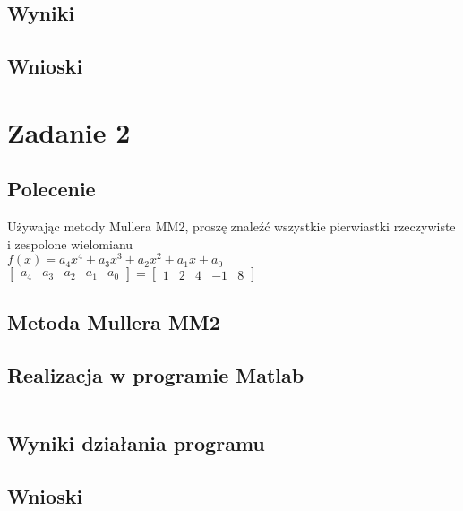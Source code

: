 \documentclass[a4paper, 11pt]{article}
\begin{document}
\subsection{Wyniki}


\subsection{Wnioski}


\section{Zadanie 2}

\subsection{Polecenie}
Używając metody Mullera MM2, proszę znaleźć wszystkie pierwiastki rzeczywiste i zespolone wielomianu \\
$f(x) = a_{4}x^4+a_{3}x^3+a_{2}x^2+a_{1}x+a_{0}$ 
$
\left[
\begin{array}{ccccc}
       a_{4} & a_{3} & a_{2} & a_{1} & a_{0}
\end{array}
\right]
=
\left[
\begin{array}{ccccc}
       1 & 2 & 4 & -1 & 8
\end{array}
\right]$


\subsection{Metoda Mullera MM2}


\subsection{Realizacja w programie Matlab}
\begin{lstlisting}

\end{lstlisting}

\vspace{2cm}

\subsection{Wyniki działania programu}

\vspace{10cm}
\subsection{Wnioski}

	
\end{document}
